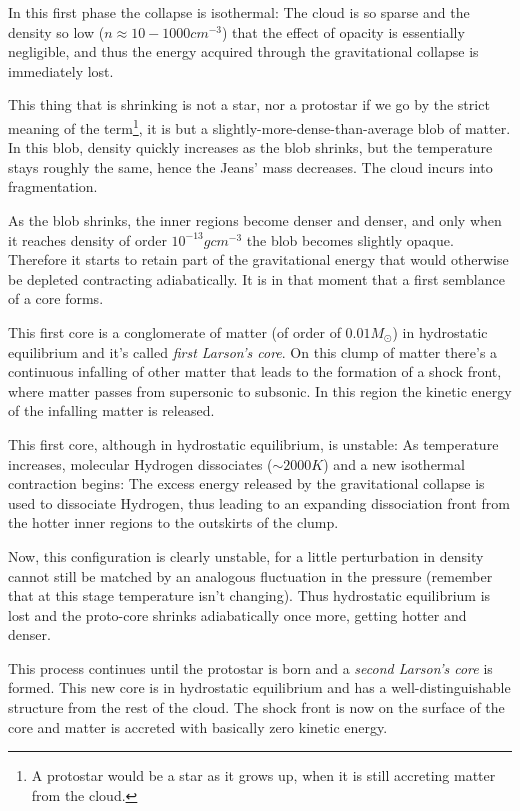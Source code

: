 \par In this first phase the collapse is isothermal: The cloud is so sparse and the density so low ($n\approx 10-1000\unit{cm}^{-3}$) that the effect of opacity is essentially negligible, and thus the energy acquired through the gravitational collapse is immediately lost.
\par This thing that is shrinking is not a star, nor a protostar if we go by the strict meaning of the term\footnote{A protostar would be a star as it grows up, when it is still accreting matter from the cloud.}, it is but a slightly-more-dense-than-average blob of matter. In this blob, density quickly increases as the blob shrinks, but the temperature stays roughly the same, hence the Jeans' mass decreases. The cloud incurs into fragmentation.
\par As the blob shrinks, the inner regions become denser and denser, and only when it reaches density of order $10^{-13}\unit{g}\unit{cm}^{-3}$ the blob becomes slightly opaque. Therefore it starts to retain part of the gravitational energy that would otherwise be depleted contracting adiabatically. It is in that moment that a first semblance of a core forms.
\par This first core is a conglomerate of matter (of order of $0.01M_{\odot}$) in hydrostatic equilibrium and it's called \emph{first Larson's core}. On this clump of matter there's a continuous infalling of other matter that leads to the formation of a shock front, where matter passes from supersonic to subsonic. In this region the kinetic energy of the infalling matter is released.
\par This first core, although in hydrostatic equilibrium, is unstable: As temperature increases, molecular Hydrogen dissociates ($\sim 2000\unit{K}$) and a new isothermal contraction begins: The excess energy released by the gravitational collapse is used to dissociate Hydrogen, thus leading to an expanding dissociation front from the hotter inner regions to the outskirts of the clump.
\par Now, this configuration is clearly unstable, for a little perturbation in density cannot still be matched by an analogous fluctuation in the pressure (remember that at this stage temperature isn't changing). Thus hydrostatic equilibrium is lost and the proto-core shrinks adiabatically once more, getting hotter and denser. 
\par This process continues until the protostar is born and a \emph{second Larson's core} is formed. This new core is in hydrostatic equilibrium and has a well-distinguishable structure from the rest of the cloud. The shock front is now on the surface of the core and matter is accreted with basically zero kinetic energy. 
